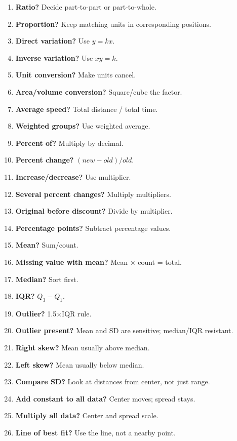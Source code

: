 \documentclass[
]{article}
\providecommand{\tightlist}{%
  \setlength{\itemsep}{0pt}\setlength{\parskip}{0pt}}
\begin{document}
\begin{enumerate}
\def\labelenumi{\arabic{enumi}.}
\tightlist
\item
  \textbf{Ratio?} Decide part-to-part or part-to-whole.
\item
  \textbf{Proportion?} Keep matching units in corresponding positions.
\item
  \textbf{Direct variation?} Use \(y=kx\).
\item
  \textbf{Inverse variation?} Use \(xy=k\).
\item
  \textbf{Unit conversion?} Make units cancel.
\item
  \textbf{Area/volume conversion?} Square/cube the factor.
\item
  \textbf{Average speed?} Total distance / total time.
\item
  \textbf{Weighted groups?} Use weighted average.
\item
  \textbf{Percent of?} Multiply by decimal.
\item
  \textbf{Percent change?} \((new-old)/old\).
\item
  \textbf{Increase/decrease?} Use multiplier.
\item
  \textbf{Several percent changes?} Multiply multipliers.
\item
  \textbf{Original before discount?} Divide by multiplier.
\item
  \textbf{Percentage points?} Subtract percentage values.
\item
  \textbf{Mean?} Sum/count.
\item
  \textbf{Missing value with mean?} Mean × count = total.
\item
  \textbf{Median?} Sort first.
\item
  \textbf{IQR?} \(Q_3-Q_1\).
\item
  \textbf{Outlier?} 1.5×IQR rule.
\item
  \textbf{Outlier present?} Mean and SD are sensitive; median/IQR
  resistant.
\item
  \textbf{Right skew?} Mean usually above median.
\item
  \textbf{Left skew?} Mean usually below median.
\item
  \textbf{Compare SD?} Look at distances from center, not just range.
\item
  \textbf{Add constant to all data?} Center moves; spread stays.
\item
  \textbf{Multiply all data?} Center and spread scale.
\item
  \textbf{Line of best fit?} Use the line, not a nearby point.

\end{enumerate}
\end{document}
